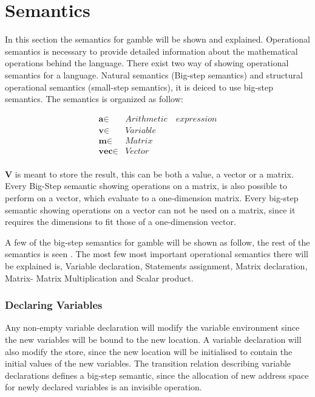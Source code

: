 \chapter{Semantics}
In this section the semantics for \acrshort{gamble} will be shown and explained.
Operational semantics is necessary to provide detailed information about the mathematical operations behind the language.
There exist two way of showing operational semantics for a language.
Natural semantics (Big-step semantics) and structural operational semantics (small-step semantics), it is deiced to use big-step semantics.
The semantics is organized as follow:

\begin{align*}
	\textbf{a} \in  &Arithmetic\quad expression\\
	\textbf{v} \in  &Variable\\
	\textbf{m} \in  &Matrix\\
	\textbf{vec} \in  &Vector\\
\end{align*}

\textbf{V} is meant to store the result, this can be both a value, a vector or a matrix.
Every Big-Step semantic showing operations on a matrix, is also possible to perform on a vector, which evaluate to a one-dimension matrix.
Every big-step semantic showing operations on a vector can not be used on a matrix, since it requires the dimensions to fit those of a one-dimension vector.

A few of the big-step semantics for \acrshort{gamble} will be shown as follow, the rest of the semantics is seen .
The most few most important operational semantics there will be explained is, Variable declaration, Statements assignment, Matrix declaration, Matrix- Matrix Multiplication and Scalar product.


\subsection*{Declaring Variables}
Any non-empty variable declaration will modify the variable environment since the new variables will be bound to the new location.
A variable declaration will also modify the store, since the new location will be initialised to contain the initial values of the new variables.
The transition relation describing variable declarations defines a big-step semantic, since the allocation of new address space for newly declared variables is an invisible operation.

